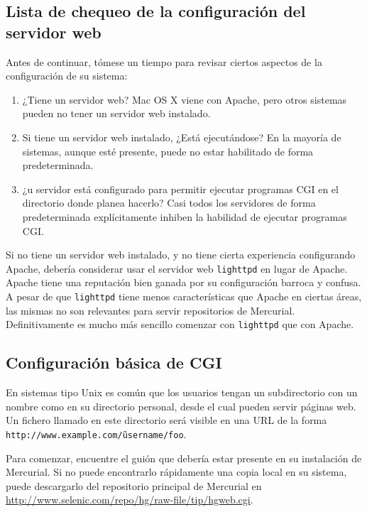 \subsection{Lista de chequeo de la configuración del servidor web}

Antes de continuar, tómese un tiempo para revisar ciertos aspectos de
la configuración de su sistema:

\begin{enumerate}
\item ¿Tiene un servidor web?  Mac OS X viene con Apache, pero otros
  sistemas pueden no tener un servidor web instalado.
\item Si tiene un servidor web instalado, ¿Está ejecutándose?  En la
  mayoría de sistemas, aunque esté presente, puede no estar habilitado
  de forma predeterminada.
\item ¿u servidor está configurado para permitir ejecutar programas
  CGI en el directorio donde planea hacerlo?  Casi todos los
  servidores de forma predeterminada explícitamente inhiben la
  habilidad de ejecutar programas CGI.
\end{enumerate}

Si no tiene un servidor web instalado, y no tiene cierta experiencia
configurando  Apache, debería considerar usar el servidor web
\texttt{lighttpd} en lugar de Apache.  Apache tiene una reputación
bien ganada por su configuración barroca y confusa.
A pesar de que \texttt{lighttpd} tiene menos características que
Apache en ciertas áreas, las mismas no son relevantes para servir
repositorios de Mercurial.  Definitivamente es mucho más sencillo
comenzar con \texttt{lighttpd} que con Apache.

\subsection{Configuración básica de CGI}

En sistemas tipo Unix es común que los usuarios tengan un subdirectorio
con un nombre como  en su directorio personal,
desde el cual pueden servir páginas web.  Un fichero llamado 
en este directorio será visible en una URL de la forma
\texttt{http://www.example.com/\~username/foo}.

Para comenzar, encuentre el guión  que debería
estar presente en su instalación de Mercurial.  Si no puede
encontrarlo rápidamente una copia local en su sistema, puede
descargarlo del repositorio principal de Mercurial en
\url{http://www.selenic.com/repo/hg/raw-file/tip/hgweb.cgi}.

